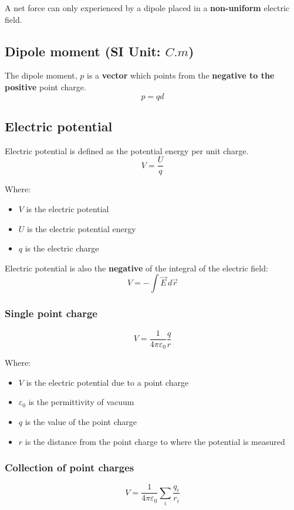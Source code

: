 \documentclass[11pt]{article}
\begin{document}
A net force can only experienced by a dipole placed in a \textbf{non-uniform} electric field.

\subsection{Dipole moment (SI Unit: \(\unit{C.m}\))}
\label{sec:orgcd810b4}
The dipole moment, \(p\) is a \textbf{vector} which points from the \textbf{negative to the positive} point charge.
\[p = qd\]

\subsection{Electric potential}
\label{sec:org4831999}
Electric potential is defined as the potential energy per unit charge.
\[V = \frac{U}{q}\]

Where:
\begin{itemize}
\item \(V\) is the electric potential
\item \(U\) is the electric potential energy
\item \(q\) is the electric charge
\end{itemize}

Electric potential is also the \textbf{negative} of the integral of the electric field:
\[V = - \int \vec{E} \, d \vec{r}\]

\subsubsection{Single point charge}
\label{sec:orgac85d22}
\[V = \frac{1}{4 \pi \varepsilon_0} \frac{q}{r}\]

Where:
\begin{itemize}
\item \(V\) is the electric potential due to a point charge
\item \(\varepsilon_0\) is the permittivity of vacuum
\item \(q\) is the value of the point charge
\item \(r\) is the distance from the point charge to where the potential is measured
\end{itemize}

\subsubsection{Collection of point charges}
\label{sec:org727a8a8}
\[V = \frac{1}{4 \pi \varepsilon_0} \sum_i \frac{q_i}{r_i}\]
\end{document}
